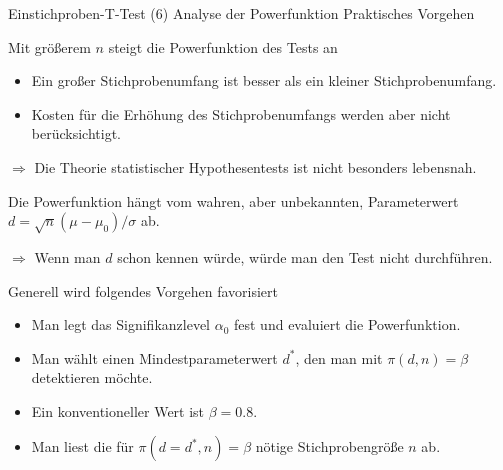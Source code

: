 \documentclass[
  8pt,
  ignorenonframetext,
]{beamer}
\begin{document}
\begin{frame}{Einstichproben-T-Test \textbar{} (6) Analyse der
Powerfunktion}
\protect\hypertarget{einstichproben-t-test-6-analyse-der-powerfunktion-4}{}
Praktisches Vorgehen \small

Mit größerem \(n\) steigt die Powerfunktion des Tests an

\begin{itemize}
\item
  Ein großer Stichprobenumfang ist besser als ein kleiner
  Stichprobenumfang.
\item
  Kosten für die Erhöhung des Stichprobenumfangs werden aber nicht
  berücksichtigt.
\end{itemize}

\(\Rightarrow\) Die Theorie statistischer Hypothesentests ist nicht
besonders lebensnah.

\vspace{1mm}

Die Powerfunktion hängt vom wahren, aber unbekannten, Parameterwert
\(d = \sqrt{n}(\mu - \mu_0)/\sigma\) ab.

\(\Rightarrow\) Wenn man \(d\) schon kennen würde, würde man den Test
nicht durchführen.

\vspace{1mm}

Generell wird folgendes Vorgehen favorisiert

\begin{itemize}
\item
  Man legt das Signifikanzlevel \(\alpha_0\) fest und evaluiert die
  Powerfunktion.
\item
  Man wählt einen Mindestparameterwert \(d^*\), den man mit
  \(\pi(d,n) = \beta\) detektieren möchte.
\item
  Ein konventioneller Wert ist \(\beta = 0.8\).
\item
  Man liest die für \(\pi(d = d^*,n) = \beta\) nötige Stichprobengröße
  \(n\) ab.
\end{itemize}
\end{frame}
\end{document}

